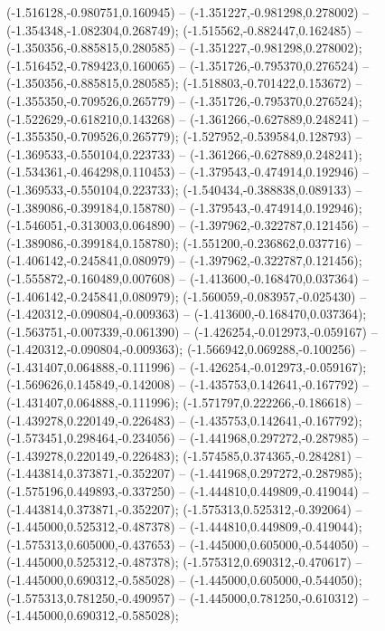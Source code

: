  (-1.516128,-0.980751,0.160945) -- (-1.351227,-0.981298,0.278002) -- (-1.354348,-1.082304,0.268749);
 (-1.515562,-0.882447,0.162485) -- (-1.350356,-0.885815,0.280585) -- (-1.351227,-0.981298,0.278002);
 (-1.516452,-0.789423,0.160065) -- (-1.351726,-0.795370,0.276524) -- (-1.350356,-0.885815,0.280585);
 (-1.518803,-0.701422,0.153672) -- (-1.355350,-0.709526,0.265779) -- (-1.351726,-0.795370,0.276524);
 (-1.522629,-0.618210,0.143268) -- (-1.361266,-0.627889,0.248241) -- (-1.355350,-0.709526,0.265779);
 (-1.527952,-0.539584,0.128793) -- (-1.369533,-0.550104,0.223733) -- (-1.361266,-0.627889,0.248241);
 (-1.534361,-0.464298,0.110453) -- (-1.379543,-0.474914,0.192946) -- (-1.369533,-0.550104,0.223733);
 (-1.540434,-0.388838,0.089133) -- (-1.389086,-0.399184,0.158780) -- (-1.379543,-0.474914,0.192946);
 (-1.546051,-0.313003,0.064890) -- (-1.397962,-0.322787,0.121456) -- (-1.389086,-0.399184,0.158780);
 (-1.551200,-0.236862,0.037716) -- (-1.406142,-0.245841,0.080979) -- (-1.397962,-0.322787,0.121456);
 (-1.555872,-0.160489,0.007608) -- (-1.413600,-0.168470,0.037364) -- (-1.406142,-0.245841,0.080979);
 (-1.560059,-0.083957,-0.025430) -- (-1.420312,-0.090804,-0.009363) -- (-1.413600,-0.168470,0.037364);
 (-1.563751,-0.007339,-0.061390) -- (-1.426254,-0.012973,-0.059167) -- (-1.420312,-0.090804,-0.009363);
 (-1.566942,0.069288,-0.100256) -- (-1.431407,0.064888,-0.111996) -- (-1.426254,-0.012973,-0.059167);
 (-1.569626,0.145849,-0.142008) -- (-1.435753,0.142641,-0.167792) -- (-1.431407,0.064888,-0.111996);
 (-1.571797,0.222266,-0.186618) -- (-1.439278,0.220149,-0.226483) -- (-1.435753,0.142641,-0.167792);
 (-1.573451,0.298464,-0.234056) -- (-1.441968,0.297272,-0.287985) -- (-1.439278,0.220149,-0.226483);
 (-1.574585,0.374365,-0.284281) -- (-1.443814,0.373871,-0.352207) -- (-1.441968,0.297272,-0.287985);
 (-1.575196,0.449893,-0.337250) -- (-1.444810,0.449809,-0.419044) -- (-1.443814,0.373871,-0.352207);
 (-1.575313,0.525312,-0.392064) -- (-1.445000,0.525312,-0.487378) -- (-1.444810,0.449809,-0.419044);
 (-1.575313,0.605000,-0.437653) -- (-1.445000,0.605000,-0.544050) -- (-1.445000,0.525312,-0.487378);
 (-1.575312,0.690312,-0.470617) -- (-1.445000,0.690312,-0.585028) -- (-1.445000,0.605000,-0.544050);
 (-1.575313,0.781250,-0.490957) -- (-1.445000,0.781250,-0.610312) -- (-1.445000,0.690312,-0.585028);

